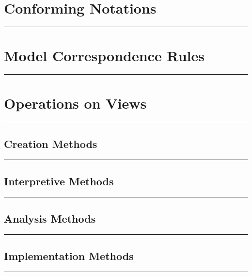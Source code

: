 \documentclass[11pt]{article}
\begin{document}
\vspace{4em}

\section*{Conforming Notations}
\noindent\rule{0.72\linewidth}{0.4pt}

\vspace{4em}

\section*{Model Correspondence Rules}
\noindent\rule{0.72\linewidth}{0.4pt}

\vspace{6em}

\section*{Operations on Views}
\noindent\rule{0.72\linewidth}{0.4pt}

\subsection*{Creation Methods}
\noindent\rule{0.72\linewidth}{0.4pt}

\vspace{4em}

\subsection*{Interpretive Methods}
\noindent\rule{0.72\linewidth}{0.4pt}

\vspace{4em}

\subsection*{Analysis Methods}
\noindent\rule{0.72\linewidth}{0.4pt}

\vspace{4em}

\subsection*{Implementation Methods}
\noindent\rule{0.72\linewidth}{0.4pt}
\end{document}
